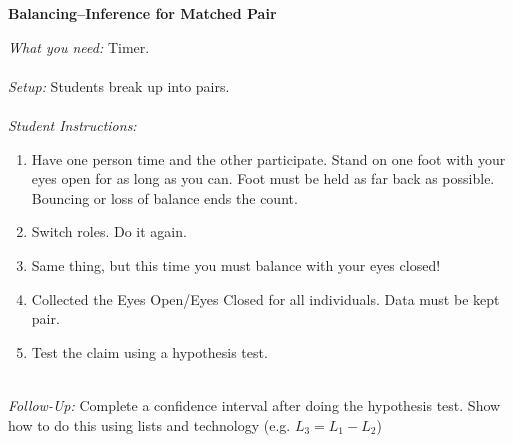 \documentclass[12pt]{amsart}
\theoremstyle{definition}
\begin{document}
      \begin{framed}
      	\begin{center} \textbf{Balancing--Inference for Matched Pair} \end{center}
      	\emph{What you need:} Timer.\\
      	~\\
      	\emph{Setup:} Students break up into pairs.\\
      	~\\
      	\emph{Student Instructions:} 
      	\begin{enumerate}
      		\item Have one person time and the other participate. Stand on one foot with your eyes open for as long as you can. Foot must be held as far back as possible. Bouncing or loss of balance ends the count.
      		\item Switch roles. Do it again.
      		\item Same thing, but this time you must balance with your eyes closed!
      		\item Collected the Eyes Open/Eyes Closed for all individuals. Data must be kept pair.
      		\item Test the claim using a hypothesis test.
      	\end{enumerate}
      	~\\
      	\emph{Follow-Up:} Complete a confidence interval after doing the hypothesis test. Show how to do this using lists and technology (e.g. $L_3=L_1-L_2$)
      \end{framed}

      \newpage
      
\end{document}
